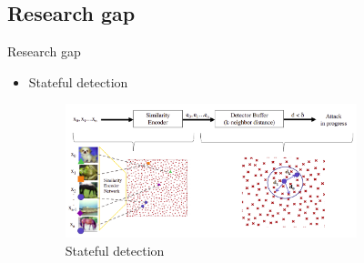 \documentclass[11pt,t]{beamer}
\begin{document}
%

\subsection{Research gap}
\begin{frame}{Research gap}
	\begin{itemize}
	\item Stateful detection
	
		\begin{figure}
		\centering
		\includegraphics[width=0.8\textwidth]{graphics/stateful_detection.png}
		\caption{Stateful detection \cite{chen2019stateful}	
		\label{fig:stateful_detection}}
		\footnotesize
		\flushleft
		\end{figure}
	\end{itemize}
\end{frame}
\end{document}
